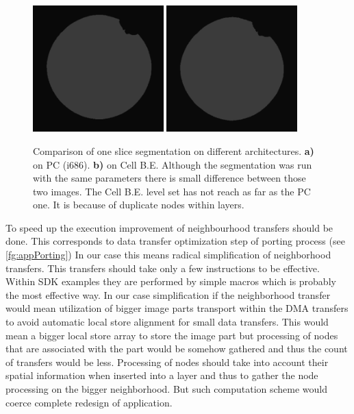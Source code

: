 \begin{figure}
    \centering
    \includegraphics[width=0.45\textwidth]{data/png/pcSlice}
    \includegraphics[width=0.45\textwidth]{data/png/cellSlice}
    \caption[Slice comparison]{Comparison of one slice segmentation on different architectures.
    \textbf{a)} on PC (i686).
    \textbf{b)} on Cell B.E.
Although the segmentation was run with the same parameters there is small difference between those two images.
The Cell B.E. level set has not reach as far as the PC one.
It is because of duplicate nodes within layers.
}
    \label{fg:sliceComparison}
\end{figure}

\par
To speed up the execution improvement of neighbourhood transfers should be done.
This corresponds to data transfer optimization step of porting process (see \ref{fg:appPorting})
In our case this means radical simplification of neighborhood transfers.
This transfers should take only a few instructions to be effective.
Within SDK examples they are performed by simple macros which is probably the most effective way.
In our case simplification if the neighborhood transfer would mean utilization of bigger image parts transport within the DMA transfers to avoid automatic local store alignment for small data transfers.
This would mean a bigger local store array to store the image part but processing of nodes that are associated with the part would be somehow gathered and thus the count of transfers would be less.
Processing of nodes should take into account their spatial information when inserted into a layer and thus to gather the node processing on the bigger neighborhood.
But such computation scheme would coerce complete redesign of application.

